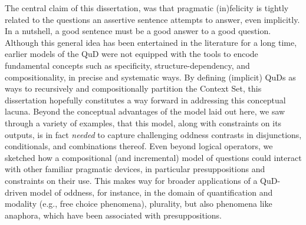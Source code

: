 The central claim of this dissertation, was that pragmatic (in)felicity is tightly related to the questions an assertive sentence attempts to answer, even implicitly. In a nutshell, a good sentence must be a good answer to a good question. Although this general idea has been entertained in the literature for a long time, earlier models of the QuD were not equipped with the tools to encode fundamental concepts such as specificity, structure-dependency, and compositionality, in precise and systematic ways. By defining (implicit) QuDs as ways to recursively and compositionally partition the Context Set, this dissertation hopefully constitutes a way forward in addressing this conceptual lacuna. Beyond the conceptual advantages of the model laid out here, we saw through a variety of examples, that this model, along with constraints on its outputs, is in fact \textit{needed} to capture challenging oddness contrasts in disjunctions, conditionals, and combinations thereof. Even beyond logical operators, we sketched how a compositional (and incremental) model of questions could interact with other familiar pragmatic devices, in particular presuppositions and constraints on their use. This makes way for broader applications of a QuD-driven model of oddness, for instance, in the domain of quantification and modality (e.g., free choice phenomena), plurality, but also phenomena like anaphora, which have been associated with presuppositions.